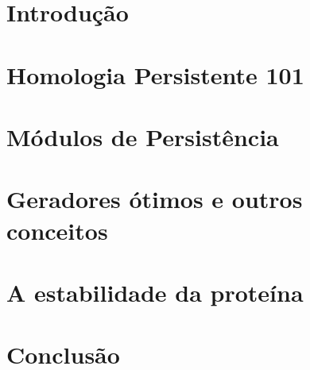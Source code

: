 \documentclass[mestrado, pre-defesa, draft]{packages/icmc}
\begin{document}
\textual

\chapter{Introdução}
\label{chapter:introducao}


\chapter{Homologia Persistente 101}
\label{chapter:hp101}


\chapter{Módulos de Persistência}
\label{chapter:mph}


\chapter{Geradores ótimos e outros conceitos}
\label{chapter:miscel}


\chapter{A estabilidade da proteína}
\label{chapter:aplicacoes}


\chapter{Conclusão}
\label{chapter:conclusao}



%

\postextual



\end{document}
